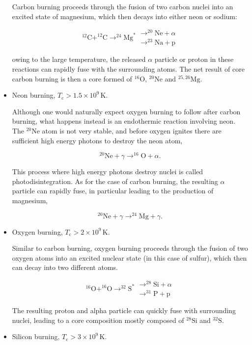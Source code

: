 \documentclass[twocolumn]{article}
\begin{document}
\begin{itemize}
  Carbon burning proceeds through the fusion of two carbon nuclei into
  an excited state of magnesium, which then decays into either neon or
  sodium:

  \[^{12}\mathrm{C}+^{12}\mathrm{C}\rightarrow ^{24}\mathrm{Mg}^*
  \begin{array}{l}
  \rightarrow ^{20}\mathrm{Ne}+\alpha\\
  \rightarrow ^{23}\mathrm{Na}+\mathrm{p}
  \end{array}\]

  owing to the large temperature, the released \(\alpha\) particle or
  proton in these reactions can rapidly fuse with the surrounding atoms.
  The net result of core carbon burning is then a core formed of
  \(^{16}\mathrm{O}\), \(^{20}\mathrm{Ne}\) and \(^{25,26}\mathrm{Mg}\).
\item
  Neon burning, \(T_\mathrm{c}>1.5\times 10^9\,\mathrm{K}.\)

  Although one would naturally expect oxygen burning to follow after
  carbon burning, what happens instead is an endothermic reaction
  involving neon. The \(^{20}\mathrm{Ne}\) atom is not very stable, and
  before oxygen ignites there are sufficient high energy photons to
  destroy the neon atom,

  \[^{20}\mathrm{Ne}+\gamma\rightarrow ^{16}\mathrm{O}+\alpha.\]

  This process where high energy photons destroy nuclei is called
  photodisintegration. As for the case of carbon burning, the resulting
  \(\alpha\) particle can rapidly fuse, in particular leading to the
  production of magnesium,

  \[^{20}\mathrm{Ne}+\gamma \rightarrow ^{24}\mathrm{Mg}+\gamma.\]
\item
  Oxygen burning, \(T_\mathrm{c}>2\times 10^9\,\mathrm{K}.\)

  Similar to carbon burning, oxygen burning proceeds through the fusion
  of two oxygen atoms into an excited nuclear state (in this case of
  sulfur), which then can decay into two different atoms.

  \[^{16}\mathrm{O}+^{16}\mathrm{O}\rightarrow ^{32}\mathrm{S}^*
  \begin{array}{l}
  \rightarrow ^{28}\mathrm{Si}+\alpha\\
  \rightarrow ^{31}\mathrm{P}+\mathrm{p}
  \end{array}\]

  The resulting proton and alpha particle can quickly fuse with
  surrounding nuclei, leading to a core composition mostly composed of
  \(^{28}\mathrm{Si}\) and \(^{32}\mathrm{S}\).
\item
  Silicon burning, \(T_\mathrm{c}>3\times 10^9\,\mathrm{K}.\)


\end{itemize}
\end{document}
